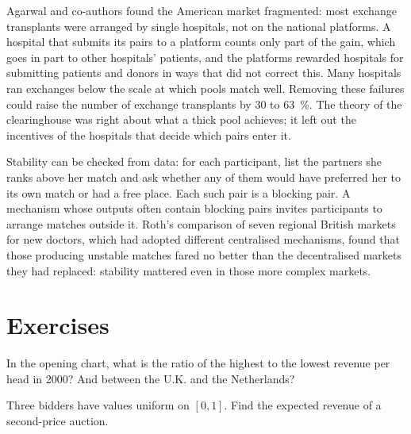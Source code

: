 \begin{record}
Agarwal and co-authors found the American market fragmented: most exchange
transplants were arranged by single hospitals, not on the national platforms. A
hospital that submits its pairs to a platform counts only part of the gain, which
goes in part to other hospitals' patients, and the platforms rewarded hospitals for
submitting patients and donors in ways that did not correct this.
Many hospitals ran exchanges below the scale at which pools match well. Removing
these failures could raise the number of exchange transplants by 30 to 63~\%.
The theory of the clearinghouse was right about what a thick pool achieves; it left
out the incentives of the hospitals that decide which pairs enter it.
\end{record}

\begin{measure}
Stability can be checked from data: for each participant, list the partners she
ranks above her match and ask whether any of them would have preferred her to its
own match or had a free place. Each such pair is a blocking pair. A mechanism whose
outputs often contain blocking pairs invites participants to arrange matches outside
it. Roth's comparison of seven regional British markets for new doctors, which had
adopted different centralised mechanisms, found that those producing unstable
matches fared no better than the decentralised markets they had replaced:
stability mattered even in those more complex markets. %
\end{measure}

\section{Exercises}\label{sec:b3:auctions-and-market-design:exercises}

\begin{exercise}[$\star$]\label{exo:b3:auctions-and-market-design:1}
In the opening chart, what is the ratio of the highest to the lowest revenue per head
in 2000? And between the U.K. and the Netherlands?
\end{exercise}

\begin{exercise}[$\star$]\label{exo:b3:auctions-and-market-design:2}
Three bidders have values uniform on $[0, 1]$. Find the expected revenue of a second-price
auction.
\end{exercise}

